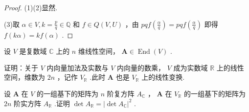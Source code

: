 \begin{proof}
	(1)(2)显然.

	(3)取 $\alpha\in V,k=\frac{p}{q}\in \mathbb{Q}$ 和 $f\in Q(V,U)$ ，由 $pqf(\frac{\alpha}{q})=pqf(\frac{\alpha}{q})$ 即得 $f(k\alpha)=kf(\alpha)$ .
\end{proof}
\begin{prob}[37]
	设 $V$ 是复数域 $\mathbb{C}$ 上的 $n$ 维线性空间， $\bm A\in\operatorname*{End}(V)$ .
	\begin{mylist}
		\item 证明：关于 $V$ 内向量加法及实数与 $V$ 内向量的数乘， $V$ 成为实数域 $\mathbb{R}$ 上的线性空间，维数为 $2n$ ，记作 $V_{\mathbb{R}}$ .此时 $\bm A$ 也是 $V_{\mathbb{R}}$ 上的线性变换.
		\item 设 $\bm A$ 在 $V$ 的一组基下的矩阵为 $n$ 阶复方阵 $A_{\mathbb{C}}$ ， $\bm A$ 在 $V_{\mathbb{R}}$ 的一组基下的矩阵为 $2n$ 阶实方阵 $A_{\mathbb{R}}$ .证明 $\det A_{\mathbb{R}}=|\det A_{\mathbb{C}}|^2$ .
	\end{mylist}
\end{prob}
